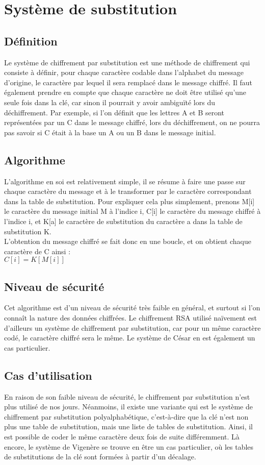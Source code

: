 	\section{Système de substitution}
		\subsection{Définition}
			Le système de chiffrement par substitution est une méthode de chiffrement qui consiste à définir, pour chaque caractère codable dans l'alphabet du message d'origine, le caractère par lequel il sera remplacé dans le message chiffré. Il faut également prendre en compte que chaque caractère ne doit être utilisé qu'une seule fois dans la clé, car sinon il pourrait y avoir ambiguïté lors du déchiffrement. Par exemple, si l'on définit que les lettres A et B seront représentées par un C dans le message chiffré, lors du déchiffrement, on ne pourra pas savoir si C était à la base un A ou un B dans le message initial.
		\subsection{Algorithme}
			L'algorithme en soi est relativement simple, il se résume à faire une passe sur chaque caractère du message et à le transformer par le caractère correspondant dans la table de substitution. Pour expliquer cela plus simplement, prenons M[i] le caractère du message initial M à l'indice i, C[i] le caractère du message chiffré à l'indice i, et K[a] le caractère de substitution du caractère a dans la table de substitution K.\\
			L'obtention du message chiffré se fait donc en une boucle, et on obtient chaque caractère de C ainsi :\\
			$C[i] = K[M[i]]$
		\subsection{Niveau de sécurité}
			Cet algorithme est d'un niveau de sécurité très faible en général, et surtout si l'on connaît la nature des données chiffrées. Le chiffrement RSA utilisé naïvement est d'ailleurs un système de chiffrement par substitution, car pour un même caractère codé, le caractère chiffré sera le même. Le système de César en est également un cas particulier.
		\subsection{Cas d'utilisation}
			En raison de son faible niveau de sécurité, le chiffrement par substitution n'est plus utilisé de nos jours. Néanmoins, il existe une variante qui est le système de chiffrement par substitution polyalphabétique, c'est-à-dire que la clé n'est non plus une table de substitution, mais une liste de tables de substitution. Ainsi, il est possible de coder le même caractère deux fois de suite différemment. Là encore, le système de Vigenère se trouve en être un cas particulier, où les tables de substitutions de la clé sont formées à partir d'un décalage.